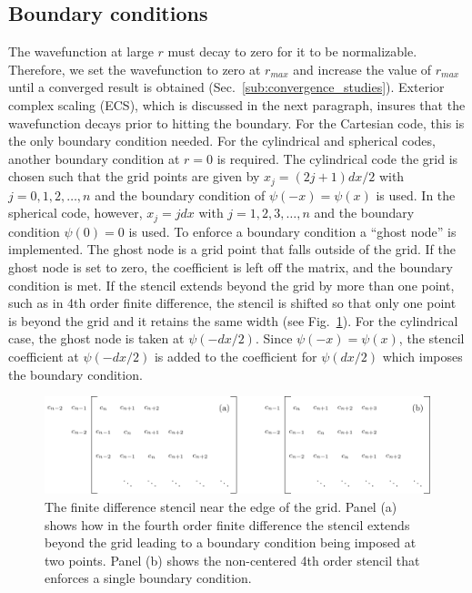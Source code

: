 \subsection{Boundary conditions} %
\label{sub:boundary_conditions}
The wavefunction at large $r$ must decay to zero for it to be normalizable. Therefore, we set the wavefunction to zero at $r_{max}$ and increase the value of $r_{max}$ until a converged result is obtained (Sec.~\ref{sub:convergence_studies}). Exterior complex scaling (ECS), which is discussed in the next paragraph, insures that the wavefunction decays prior to hitting the boundary. For the Cartesian code, this is the only boundary condition needed. For the cylindrical and spherical codes, another boundary condition at $r=0$ is required. The cylindrical code the grid is chosen such that the grid points are given by $x_j = (2j+1)dx/2$ with $j=0, 1, 2, \ldots, n$ and the boundary condition of $\psi(-x)=\psi(x)$ is used. In the spherical code, however, $x_j = jdx$ with $j=1,2,3, \ldots, n$ and the boundary condition $\psi(0)=0$ is used. To enforce a boundary condition a ``ghost node'' is implemented. The ghost node is a grid point that falls outside of the grid. If the ghost node is set to zero, the coefficient is left off the matrix, and the boundary condition is met. If the stencil extends beyond the grid by more than one point, such as in 4th order finite difference, the stencil is shifted so that only one point is beyond the grid and it retains the same width (see Fig.~\ref{fig:ghost_nodes}). For the cylindrical case, the ghost node is taken at $\psi(-dx/2)$. Since $\psi(-x)=\psi(x)$, the stencil coefficient at $\psi(-dx/2)$ is added to the coefficient for $\psi(dx/2)$ which imposes the boundary condition.

\begin{figure}[t]
\centering
   
    \includegraphics[width=\linewidth]{figs/ghost_nodes.pdf}
   
\caption{The finite difference stencil near the edge of the grid. Panel (a) shows how in the fourth order finite difference the stencil extends beyond the grid leading to a boundary condition being imposed at two points. Panel (b) shows the non-centered 4th order stencil that enforces a single boundary condition.
} 
  \label{fig:ghost_nodes}
\end{figure}



